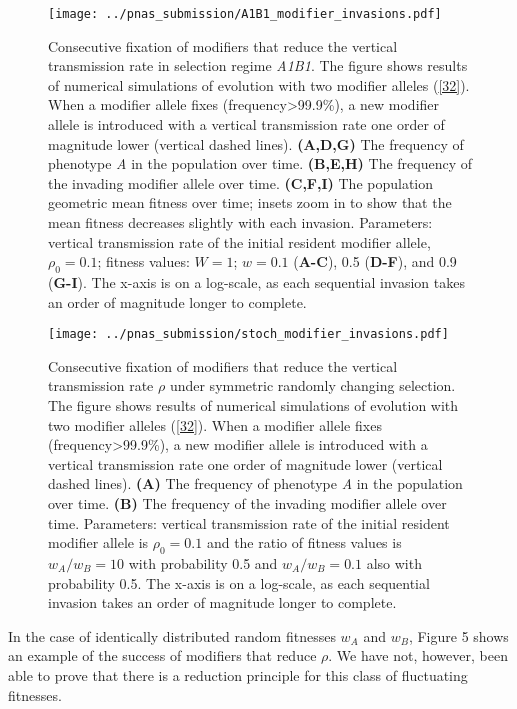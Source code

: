\documentclass[9pt,twocolumn,twoside,lineno]{pnas-new}
\begin{document}
\begin{figure}[h]
\centering
\texttt{[image: ../pnas\_submission/A1B1\_modifier\_invasions.pdf]}
\caption{Consecutive fixation of modifiers that reduce the vertical
transmission rate in selection regime \emph{A1B1}. The figure shows
results of numerical simulations of evolution with two modifier alleles
(\eqref{32}). When a modifier allele fixes
(frequency\textgreater{}99.9\%), a new modifier allele is introduced
with a vertical transmission rate one order of magnitude lower (vertical
dashed lines). \textbf{(A,D,G)} The frequency of phenotype \emph{A} in
the population over time. \textbf{(B,E,H)} The frequency of the invading
modifier allele over time. \textbf{(C,F,I)} The population geometric mean
fitness over time; insets zoom in to show that the mean fitness 
decreases slightly with each invasion. Parameters: vertical transmission rate of
the initial resident modifier allele, \(\rho_0 =0.1\); fitness values:
$W=1$; $w=0.1$ (\textbf{A-C}), 0.5 (\textbf{D-F}), and 0.9
(\textbf{G-I}). The x-axis is on a log-scale, as each sequential invasion
takes an order of magnitude longer to
complete.}\label{fig:A1B1_modifier_invasions}
\end{figure}

\begin{figure}[h]
\centering
\texttt{[image: ../pnas\_submission/stoch\_modifier\_invasions.pdf]}
\caption{Consecutive fixation of modifiers that reduce the vertical transmission rate $\rho$ under symmetric randomly changing selection.
The figure shows results of numerical simulations of evolution with two modifier alleles
(\eqref{32}).
When a modifier allele fixes (frequency\textgreater{}99.9\%),
a new modifier allele is introduced with a vertical transmission rate one order of magnitude lower (vertical dashed lines).
\textbf{(A)} The frequency of phenotype \emph{A} in the population over time.
\textbf{(B)} The frequency of the invading modifier allele over time.
Parameters: vertical transmission rate of the initial resident modifier allele is \(\rho_0 =0.1\) and the ratio of fitness values  is $w_A/w_B=10$ with probability 0.5 and $w_A/w_B=0.1$ also with probability 0.5.
The x-axis is on a log-scale, as each sequential invasion takes an order of magnitude longer to complete.}\label{fig:stoch_modifier_invasions}
\end{figure}

 In the case of identically distributed random fitnesses $w_A$ and $w_B$, Figure 5 shows  an example of the success of modifiers that reduce $\rho$. We have not, however, been able to prove that there is a reduction principle for this class of fluctuating fitnesses.
  
\end{document}
